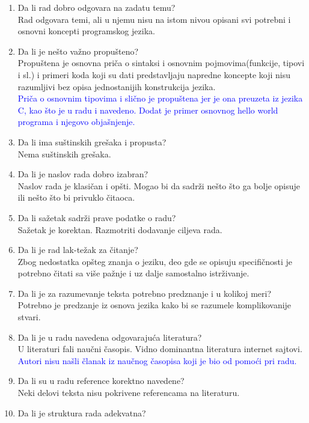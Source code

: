 \documentclass[a4paper]{report}
\newcommand{\odgovor}[1]{\textcolor{blue}{#1}}
\begin{document}
\begin{enumerate}
\item Da li rad dobro odgovara na zadatu temu?\\
Rad odgovara temi, ali u njemu nisu na istom nivou opisani svi potrebni i osnovni koncepti programskog jezika.
\item Da li je nešto važno propušteno?\\
Propuštena je osnovna priča o sintaksi i osnovnim pojmovima(funkcije, tipovi i sl.) i primeri koda koji su dati predstavljaju napredne koncepte koji nisu razumljivi bez opisa jednostanijih konstrukcija jezika. \\
\odgovor{Priča o osnovnim tipovima i slično je propuštena jer je ona preuzeta iz jezika C, kao što je u radu i navedeno. Dodat je primer osnovnog hello world programa i njegovo objašnjenje.}
\item Da li ima suštinskih grešaka i propusta?\\
Nema suštinskih grešaka. 
\item Da li je naslov rada dobro izabran?\\
Naslov rada je klasičan i opšti. Mogao bi da sadrži nešto što ga bolje opisuje ili nešto što bi privuklo čitaoca.
\item Da li sažetak sadrži prave podatke o radu?\\
Sažetak je korektan. Razmotriti dodavanje ciljeva rada.
\item Da li je rad lak-težak za čitanje?\\
Zbog nedostatka opšteg znanja o jeziku, deo gde se opisuju specifičnosti je potrebno čitati sa više pažnje i uz dalje samostalno istrživanje.
\item Da li je za razumevanje teksta potrebno predznanje i u kolikoj meri?\\
Potrebno je predzanje iz osnova jezika kako bi se razumele komplikovanije stvari.
\item Da li je u radu navedena odgovarajuća literatura?\\
U literaturi fali naučni časopis. Vidno dominantna literatura internet sajtovi. \\
\odgovor{Autori nisu našli članak iz naučnog časopisa koji je bio od pomoći pri radu.}
\item Da li su u radu reference korektno navedene?\\
Neki delovi teksta nisu pokrivene referencama na literaturu. 
\item Da li je struktura rada adekvatna?\\

\end{enumerate}
\end{document}
